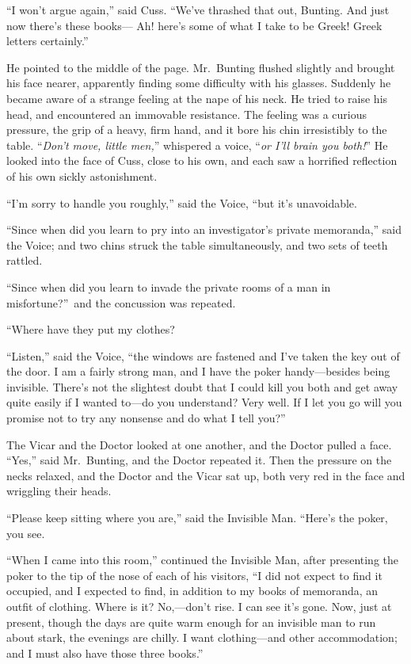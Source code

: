 “I won’t argue again,” said Cuss. “We’ve thrashed that out, Bunting. And just now there’s these books— Ah! here’s some of what I take to be Greek! Greek letters certainly.”

He pointed to the middle of the page. Mr.\ Bunting flushed slightly and brought his face nearer, apparently finding some difficulty with his glasses. Suddenly he became aware of a strange feeling at the nape of his neck. He tried to raise his head, and encountered an immovable resistance. The feeling was a curious pressure, the grip of a heavy, firm hand, and it bore his chin irresistibly to the table. “\emph{Don’t move, little men,}” whispered a voice, “\emph{or I’ll brain you both!}” He looked into the face of Cuss, close to his own, and each saw a horrified reflection of his own sickly astonishment.

“I’m sorry to handle you roughly,” said the Voice, “but it’s unavoidable.

“Since when did you learn to pry into an investigator’s private memoranda,” said the Voice; and two chins struck the table simultaneously, and two sets of teeth rattled.

“Since when did you learn to invade the private rooms of a man in misfortune?”\ and the concussion was repeated.

“Where have they put my clothes?

“Listen,” said the Voice, “the windows are fastened and I’ve taken the key out of the door. I am a fairly strong man, and I have the poker handy—besides being invisible. There’s not the slightest doubt that I could kill you both and get away quite easily if I wanted to—do you understand? Very well. If I let you go will you promise not to try any nonsense and do what I tell you?”

The Vicar and the Doctor looked at one another, and the Doctor pulled a face. “Yes,” said Mr.\ Bunting, and the Doctor repeated it. Then the pressure on the necks relaxed, and the Doctor and the Vicar sat up, both very red in the face and wriggling their heads.

“Please keep sitting where you are,” said the Invisible Man. “Here’s the poker, you see.

“When I came into this room,” continued the Invisible Man, after presenting the poker to the tip of the nose of each of his visitors, “I did not expect to find it occupied, and I expected to find, in addition to my books of memoranda, an outfit of clothing. Where is it? No,—don’t rise. I can see it’s gone. Now, just at present, though the days are quite warm enough for an invisible man to run about stark, the evenings are chilly. I want clothing—and other accommodation; and I must also have those three books.”